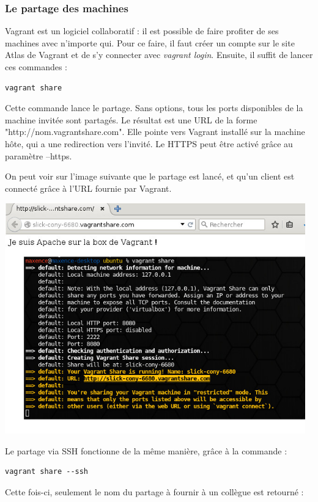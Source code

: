 \documentclass[12pt,a4paper]{article}
\begin{document}
\subsubsection{Le partage des machines}
Vagrant est un logiciel collaboratif : il est possible de faire profiter de ses machines avec n'importe qui. Pour ce faire, il faut créer un compte sur le site Atlas de Vagrant et de s'y connecter avec \textit{vagrant login}. Ensuite, il suffit de lancer ces commandes :
\begin{lstlisting}
vagrant share
\end{lstlisting}

Cette commande lance le partage. Sans options, tous les ports disponibles de la machine invitée sont partagés. Le résultat est une URL de la forme "http://nom.vagrantshare.com". Elle pointe vers Vagrant installé sur la machine hôte, qui a une redirection vers l'invité. Le HTTPS peut être activé grâce au paramètre --https.

On peut voir sur l'image suivante que le partage est lancé, et qu'un client est connecté grâce à l'URL fournie par Vagrant.

\begin{center}
	\includegraphics[width=13cm]{images_rapport/sharehttp.jpg}
\end{center}

Le partage via SSH fonctionne de la même manière, grâce à la commande :
\begin{lstlisting}
vagrant share --ssh
\end{lstlisting}
Cette fois-ci, seulement le nom du partage à fournir à un collègue est retourné :
\end{document}
